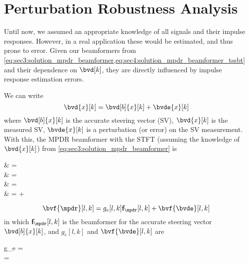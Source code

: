 \section{Perturbation Robustness Analysis}
\label{sec:perturbation_analysis}
Until now, we assumed an appropriate knowledge of all signals and their impulse responses. However, in a real application these would be estimated, and thus prone to error. Given our beamformers from \cref{eq:sec3:solution_mpdr_beamformer,eq:sec4:solution_mpdr_beamformer_tssbt} and their dependence on $\bvd[k]$, they are directly influenced by impulse response estimation errors.

We can write
\begin{equation}
	\bvd{x}[k] = \bvd[b]{x}[k] + \bvde{x}[k]
\end{equation}
where $\bvd[b]{x}[k]$ is the accurate steering vector (SV), $\bvd{x}[k]$ is the measured SV, $\bvde{x}[k]$ is a perturbation (or error) on the SV measurement. With this, the MPDR beamformer with the STFT (assuming the knowledge of $\bvd{x}[k]$) from \cref{eq:sec3:solution_mpdr_beamformer} is
\begin{equations}
	\bvf{\mpdr}
	& =  \\
	& =  \\
	& =  \\
	& =  + 
\end{equations}
\begin{equation}
	\label{eq:sec5:beamformer_approx_sv}
	\bvf{\mpdr}[l,k] = g_e[l,k] \bvfb{\mpdr}[l,k] + \bvf{\bvde}[l,k]
\end{equation}
in which $\bvfb{\mpdr}[l,k]$ is the beamformer for the accurate steering vector $\bvd[b]{x}[k]$, and $g_e[l,k]$ and $\bvf{\bvde}[l,k]$ are
\begin{subgather}
	g_e =  \\
	\bvf{\bvde} = 
\end{subgather}

